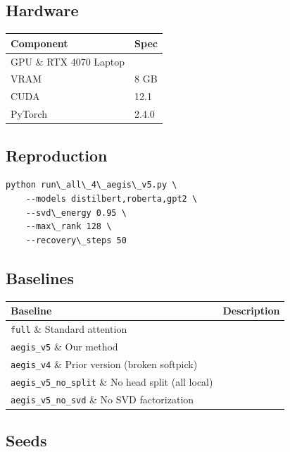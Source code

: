 \subsection{Hardware}

\begin{table}[H]
\centering
\small
\begin{tabular}{ll}
\toprule
\textbf{Component} & \textbf{Spec} \\
\midrule
GPU \& RTX 4070 Laptop \\
VRAM & 8 GB \\
CUDA & 12.1 \\
PyTorch & 2.4.0 \\
\bottomrule
\end{tabular}
\end{table}

\subsection{Reproduction}

\begin{lstlisting}
python run\_all\_4\_aegis\_v5.py \
    --models distilbert,roberta,gpt2 \
    --svd\_energy 0.95 \
    --max\_rank 128 \
    --recovery\_steps 50
\end{lstlisting}

\subsection{Baselines}

\begin{table}[H]
\centering
\small
\begin{tabular}{ll}
\toprule
\textbf{Baseline} & \textbf{Description} \\
\midrule
\texttt{full} \& Standard attention \\
\texttt{aegis\_v5} \& Our method \\
\texttt{aegis\_v4} \& Prior version (broken softpick) \\
\texttt{aegis\_v5\_no\_split} \& No head split (all local) \\
\texttt{aegis\_v5\_no\_svd} \& No SVD factorization \\
\bottomrule
\end{tabular}
\end{table}

\subsection{Seeds}

